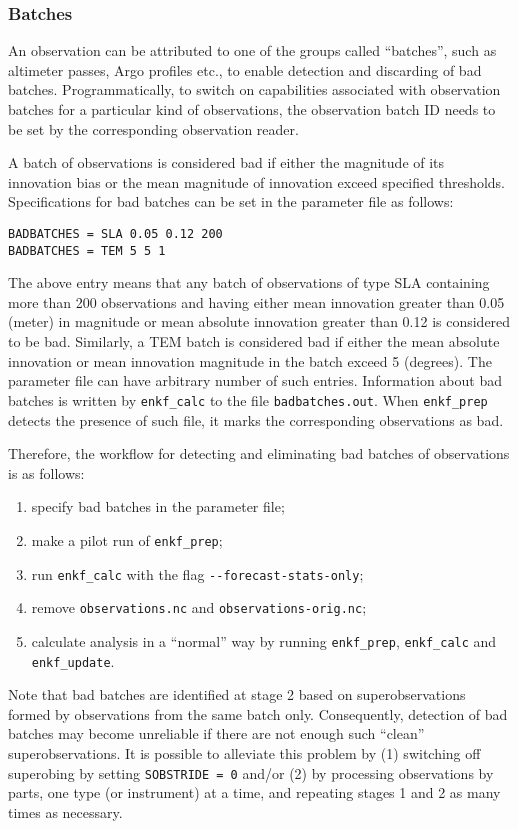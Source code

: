\documentclass[11pt]{report}
\begin{document}
\subsubsection{Batches}

An observation can be attributed to one of the groups called ``batches'', such as altimeter passes, Argo profiles etc., to enable detection and discarding of bad batches.
Programmatically, to switch on capabilities associated with observation batches for a particular kind of observations, the observation batch ID needs to be set by the corresponding observation reader.

A batch of observations is considered bad if either the magnitude of its innovation bias or the mean magnitude of innovation exceed specified thresholds.
Specifications for bad batches can be set in the parameter file as follows:
\begin{Verbatim}[frame=single,fontsize=\footnotesize]
BADBATCHES = SLA 0.05 0.12 200
BADBATCHES = TEM 5 5 1
\end{Verbatim}
The above entry means that any batch of observations of type SLA containing more than 200 observations and having either mean innovation greater than 0.05 (meter) in magnitude or mean absolute innovation greater than 0.12 is considered to be bad.
Similarly, a TEM batch is considered bad if either the mean absolute innovation or mean innovation magnitude in the batch exceed 5 (degrees).
The parameter file can have arbitrary number of such entries.
Information about bad batches is written by \verb|enkf_calc| to the file \verb|badbatches.out|.
When \verb|enkf_prep| detects the presence of such file, it marks the corresponding observations as bad.

Therefore, the workflow for detecting and eliminating bad batches of observations is as follows:
\begin{enumerate}
\item specify bad batches in the parameter file;
\item make a pilot run of \verb|enkf_prep|;
\item run \verb|enkf_calc| with the flag \verb|--forecast-stats-only|;
\item remove \verb|observations.nc| and \verb|observations-orig.nc|;
\item calculate analysis in a ``normal'' way by running \verb|enkf_prep|, \verb|enkf_calc| and \verb|enkf_update|.
\end{enumerate}

Note that bad batches are identified at stage 2 based on superobservations formed by observations from the same batch only.
Consequently, detection of bad batches may become unreliable if there are not enough such ``clean'' superobservations.
It is possible to alleviate this problem by (1) switching off superobing by setting \verb|SOBSTRIDE = 0| and/or (2) by processing observations by parts, one type (or instrument) at a time, and repeating stages 1 and 2 as many times as necessary.
\end{document}

